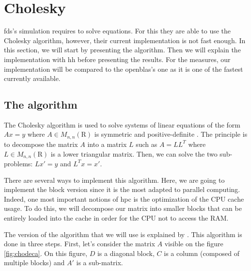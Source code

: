 
\section{Cholesky}

\gls{fds}'s simulation requires to solve equations. For this they are able to
use the Cholesky algorithm, however, their current implementation is not fast
enough. In this section, we will start by presenting the algorithm. Then we
will explain the implementation with \gls{hh} before presenting the results. For
the measures, our implementation will be compared to the openblas's one as it is
one of the fastest currently available.

\subsection{The algorithm}
\label{sec:choalgo}

The Cholesky algorithm is used to solve systems of linear equations of the form
$Ax = y$ where $A \in M_{n,n}(\mathrm{R})$ is symmetric and positive-definite
\cite{choleskywiki}. The principle is to decompose the matrix $A$ into a matrix
$L$ such as $A = LL^{T}$ where $L \in M_{n,n}(\mathrm{R})$ is a lower triangular
matrix. Then, we can solve the two sub-problems: $Lx' = y$ and $L^{T}x = x'$.

There are several ways to implement this algorithm. Here, we are going to
implement the block version since it is the most adapted to parallel computing.
Indeed, one most important notions of \gls{hpc} is the optimization of the CPU
cache usage. To do this, we will decompose our matrix into smaller blocks that
can be entirely loaded into the cache in order for the CPU not to access the
RAM.

The version of the algorithm that we will use is explained by
\cite{choleskyblock}. This algorithm is done in three steps. First, let's
consider the matrix $A$ visible on the figure \ref{fig:chodeca}. On this figure,
$D$ is a diagonal block, $C$ is a column (composed of multiple blocks) and $A'$
is a sub-matrix.

